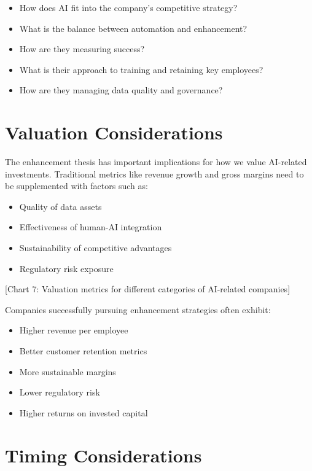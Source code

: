 \documentclass[
  Letterpaper,
]{scrbook}
\providecommand{\tightlist}{%
  \setlength{\itemsep}{0pt}\setlength{\parskip}{0pt}}\usepackage{longtable,booktabs,array}
\begin{document}
\begin{itemize}
\tightlist
\item
  How does AI fit into the company's competitive strategy?
\item
  What is the balance between automation and enhancement?
\item
  How are they measuring success?
\item
  What is their approach to training and retaining key employees?
\item
  How are they managing data quality and governance?
\end{itemize}

\section{Valuation Considerations}\label{valuation-considerations}

The enhancement thesis has important implications for how we value
AI-related investments. Traditional metrics like revenue growth and
gross margins need to be supplemented with factors such as:

\begin{itemize}
\tightlist
\item
  Quality of data assets
\item
  Effectiveness of human-AI integration
\item
  Sustainability of competitive advantages
\item
  Regulatory risk exposure
\end{itemize}

{[}Chart 7: Valuation metrics for different categories of AI-related
companies{]}

Companies successfully pursuing enhancement strategies often exhibit:

\begin{itemize}
\tightlist
\item
  Higher revenue per employee
\item
  Better customer retention metrics
\item
  More sustainable margins
\item
  Lower regulatory risk
\item
  Higher returns on invested capital
\end{itemize}

\section{Timing Considerations}\label{timing-considerations}
\end{document}
